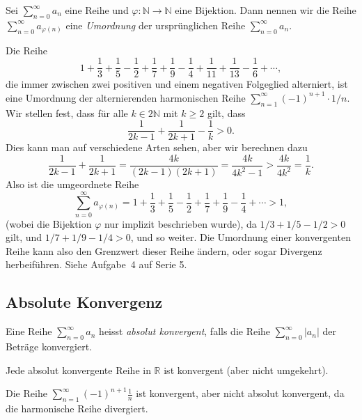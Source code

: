 \documentclass[../main.tex]{subfiles}
\begin{document}
\begin{definition}
  Sei $\sum_{n=0}^{\infty} a_n$ eine Reihe und
  $\varphi \colon \mathbb{N} \to \mathbb{N}$ eine
  Bijektion. Dann nennen wir die Reihe
  $\sum_{n=0}^{\infty} a_{\varphi(n)}$ eine
  \emph{Umordnung} der ursprünglichen
  Reihe $\sum_{n=0}^{\infty} a_n$.
\end{definition}

\begin{example}
  Die Reihe
  \[
    1 + \frac{1}{3} + \frac{1}{5} - \frac{1}{2}
    + \frac{1}{7} + \frac{1}{9} - \frac{1}{4}
    + \frac{1}{11} + \frac{1}{13} - \frac{1}{6}
    + \cdots,
  \]
  die immer zwischen zwei positiven und einem
  negativen Folgeglied alterniert,
  ist eine Umordnung der
  alternierenden harmonischen Reihe
  $\sum_{n=1}^{\infty} {(-1)}^{n+1} \cdot 1/n$.
  Wir stellen fest, dass für alle
  $k \in 2 \mathbb{N}$ mit $k \geq 2$ gilt,
  dass
  \[
    \frac{1}{2k-1} + \frac{1}{2k+1} - \frac{1}{k} > 0.
  \]
  Dies kann man auf verschiedene Arten sehen,
  aber wir berechnen dazu
  \[
    \frac{1}{2k-1} + \frac{1}{2k+1} = \frac{4k}{(2k-1)(2k+1)}
    = \frac{4k}{4k^2 - 1} > \frac{4k}{4k^2} = \frac{1}{k}.
  \]
  Also ist die umgeordnete Reihe
  \[
    \sum_{n=0}^{\infty} a_{\varphi(n)} = 
    1 + \frac{1}{3} + \frac{1}{5} - \frac{1}{2}
    + \frac{1}{7} + \frac{1}{9} - \frac{1}{4} + \cdots > 1,
  \]
  (wobei die Bijektion $\varphi$ nur implizit
  beschrieben wurde), da
  $1/3 + 1/5 - 1/2 > 0$ gilt, und $1/7 + 1/9 - 1/4 > 0$,
  und so weiter.
  Die Umordnung einer konvergenten Reihe kann also den
  Grenzwert dieser Reihe ändern,
  oder sogar Divergenz herbeiführen. Siehe Aufgabe~4
  auf Serie 5.
\end{example}

\subsection*{Absolute Konvergenz}
\begin{definition}
  Eine Reihe $\sum_{n=0}^{\infty} a_n$ heisst
  \emph{absolut konvergent}, falls die Reihe
  $\sum_{n=0}^{\infty} |a_n|$ der Beträge konvergiert.
\end{definition}

\begin{lemma*}
  Jede absolut konvergente Reihe in
  $\mathbb{R}$ ist konvergent (aber nicht umgekehrt).
\end{lemma*}

\begin{example}
  Die Reihe
  $\sum_{n=1}^{\infty} {(-1)}^{n+1}\frac{1}{n}$ 
  ist konvergent, aber
  nicht absolut konvergent, da die harmonische Reihe divergiert.
\end{example}
\end{document}

